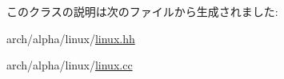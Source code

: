 このクラスの説明は次のファイルから生成されました:\begin{DoxyCompactItemize}
\item 
arch/alpha/linux/\hyperlink{arch_2alpha_2linux_2linux_8hh}{linux.hh}\item 
arch/alpha/linux/\hyperlink{arch_2alpha_2linux_2linux_8cc}{linux.cc}\end{DoxyCompactItemize}
